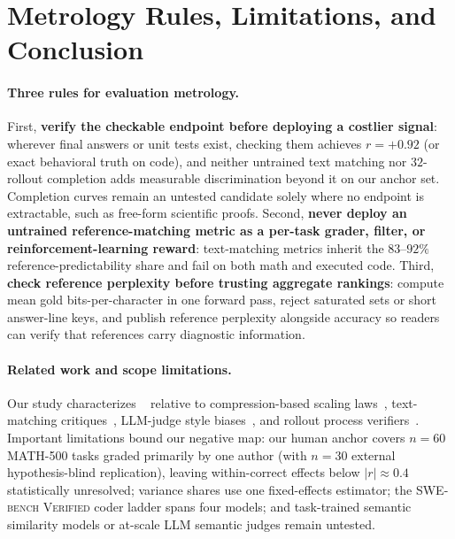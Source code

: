 \section{Metrology Rules, Limitations, and Conclusion}
\label{sec:discussion}

\paragraph{Three rules for evaluation metrology.}
First, \textbf{verify the checkable endpoint before deploying a costlier signal}: wherever final answers or unit tests exist, checking them achieves $r = +0.92$ (or exact behavioral truth on code), and neither untrained text matching nor $32$-rollout completion adds measurable discrimination beyond it on our anchor set.
Completion curves remain an untested candidate solely where no endpoint is extractable, such as free-form scientific proofs.
Second, \textbf{never deploy an untrained reference-matching metric as a per-task grader, filter, or reinforcement-learning reward}: text-matching metrics inherit the $83$--$92\%$ reference-predictability share and fail on both math and executed code.
Third, \textbf{check reference perplexity before trusting aggregate \tfa{} rankings}: compute mean gold bits-per-character in one forward pass, reject saturated sets or short answer-line keys, and publish reference perplexity alongside accuracy so readers can verify that references carry diagnostic information.

\paragraph{Related work and scope limitations.}
Our study characterizes \tfa{}~\citep{gulati2025putnam} relative to compression-based scaling laws~\citep{huang2024compression,schaeffer2025pretraining,koh2025rbridge}, text-matching critiques~\citep{yuan2021bartscore,freitag2020bleu,fomicheva2016reference}, LLM-judge style biases~\citep{wu2023style,dubois2024length,singhal2023long}, and rollout process verifiers~\citep{lightman2023verify,wang2024mathshepherd,luo2024omegaprm}.
Important limitations bound our negative map: our human anchor covers $n{=}60$ \textsc{MATH-500} tasks graded primarily by one author (with $n{=}30$ external hypothesis-blind replication), leaving within-correct effects below $|r| \approx 0.4$ statistically unresolved; variance shares use one fixed-effects estimator; the \textsc{SWE-bench Verified} coder ladder spans four models; and task-trained semantic similarity models or at-scale LLM semantic judges remain untested.

